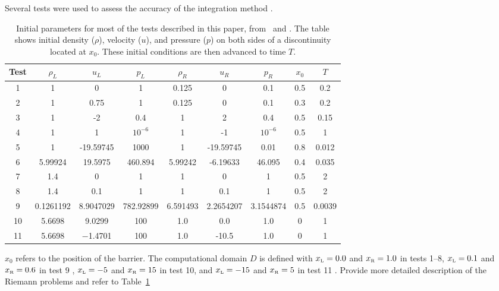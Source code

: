 \documentclass[10pt]{article}
\newcommand{\ee}[1]{{\color{blue} #1}}
\begin{document}

Several tests were used to assess the accuracy of the integration method \citep{LiskaWendroff2003}. 
\begin{table}[h!]
\begin{center}
\begin{tabular}{ |c|c c c|c c c|c c| }
 \hline
 Test & $\rho_L$ & $u_L$ & $p_L$ & $\rho_R$ & $u_R$ & $p_R$ & $x_0$ & $T$ \\
 \hline
 1 & 1 & 0 & 1 & 0.125 & 0 & 0.1 & 0.5 & 0.2 \\
 2 & 1 & 0.75 & 1 & 0.125 & 0 & 0.1 & 0.3 & 0.2 \\
 3 & 1 & -2 & 0.4 & 1 & 2 & 0.4 & 0.5 & 0.15 \\
 4 & 1 & 1 & $10^{-6}$ & 1 & -1 & $10^{-6}$ & 0.5 & 1 \\
 5 & 1 & -19.59745 & 1000 & 1 & -19.59745 & 0.01 & 0.8 & 0.012 \\
 6 & 5.99924 & 19.5975 & 460.894 & 5.99242 & -6.19633 & 46.095 & 0.4 & 0.035 \\
 7 & 1.4 & 0 & 1 & 1 & 0 & 1 & 0.5 & 2 \\
 8 & 1.4 & 0.1 & 1 & 1 & 0.1 & 1 & 0.5 & 2 \\
 9 & 0.1261192 & 8.9047029 & 782.92899 & 6.591493 & 2.2654207 & 3.1544874 & 0.5 & 0.0039 \\
10 & 5.6698 & 9.0299 & 100 & 1.0 & 0.0 & 1.0 & 0 & 1 \\
11 & 5.6698 & −1.4701 & 100 & 1.0 & -10.5 & 1.0 & 0 & 1 \\
 \hline
\end{tabular}
  \caption{Initial parameters for most of the tests described in this paper, from \citep{LiskaWendroff2003}~and \citep{Leveque2002}. The table shows initial density ($\rho$), velocity ($u$), and pressure ($p$) on both sides of a discontinuity located at $x_0$. These initial conditions are then advanced to time $T$.}
  \label{tab:testtable}
\end{center}
\end{table}
$x_0$ refers to the position of the barrier. 
The computational domain $D$ is defined with $x_{\mbox{\tiny L}}=0.0$ and $x_{\mbox{\tiny R}}=1.0$ in tests 1--8, $x_{\mbox{\tiny L}}=0.1$ and $x_{\mbox{\tiny R}}=0.6$ in test 9 \citep{LiskaWendroff2003}, $x_{\mbox{\tiny L}}=-5$ and $x_{\mbox{\tiny R}}=15$ in test 10, and $x_{\mbox{\tiny L}}=-15$ and $x_{\mbox{\tiny R}}=5$ in test 11 \citep{Leveque2002}. 
\ee{Provide more detailed description of the Riemann problems and refer to Table~\ref{tab:testtable}}
\end{document}
